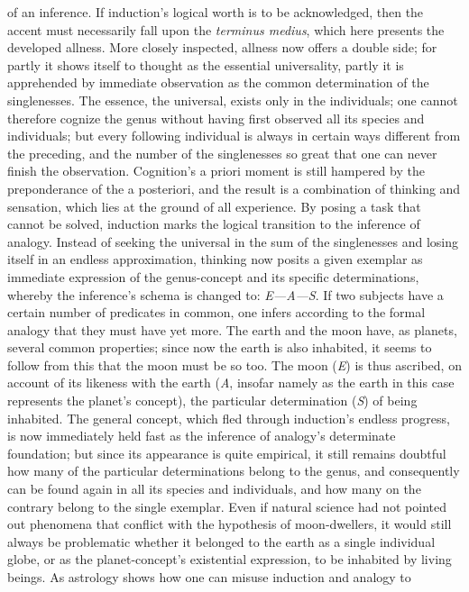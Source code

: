 \documentclass[12pt]{book}
\begin{document}
of an inference. If induction's logical worth is to be acknowledged, then
the accent must necessarily fall upon the \textit{terminus medius}, which
here presents the developed allness. More closely inspected, allness now
offers a double side; for partly it shows itself to thought as the essential
universality, partly it is apprehended by immediate observation as the
common determination of the singlenesses. The essence, the universal, exists
only in the individuals; one cannot therefore cognize the genus without
having first observed all its species and individuals; but every following
individual is always in certain ways different from the preceding, and the
number of the singlenesses so great that one can never finish the
observation. Cognition's a priori moment is still hampered by the
preponderance of the a posteriori, and the result is a combination of
thinking and sensation, which lies at the ground of all experience. By
posing a task that cannot be solved, induction marks the logical transition
to the inference of analogy. Instead of seeking the universal in the sum of
the singlenesses and losing itself in an endless approximation, thinking now
posits a given exemplar as immediate expression of the genus-concept and its
specific determinations, whereby the inference's schema is changed to:
\textit{E---A---S}. If two subjects have a certain number of predicates in
common, one infers according to the formal analogy that they must have yet
more. The earth and the moon have, as planets, several common properties;
since now the earth is also inhabited, it seems to follow from this that the
moon must be so too. The moon (\textit{E}) is thus ascribed, on account of
its likeness with the earth (\textit{A}, insofar namely as the earth in this
case represents the planet's concept), the particular determination
(\textit{S}) of being inhabited. The general concept, which fled through
induction's endless progress, is now immediately held fast as the inference
of analogy's determinate foundation; but since its appearance is quite
empirical, it still remains doubtful how many of the particular
determinations belong to the genus, and consequently can be found again in
all its species and individuals, and how many on the contrary belong to the
single exemplar. Even if natural science had not pointed out phenomena that
conflict with the hypothesis of moon-dwellers, it would still always be
problematic whether it belonged to the earth as a single individual globe,
or as the planet-concept's existential expression, to be inhabited by living
beings. As astrology shows how one can misuse induction and analogy to
\end{document}
